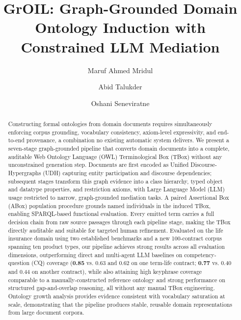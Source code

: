\documentclass[sigconf]{acmart}
\begin{document}
\title{GrOIL: Graph-Grounded Domain Ontology Induction with Constrained LLM Mediation}


\author{Maruf Ahmed Mridul}

\author{Abid Talukder}

\author{Oshani Seneviratne}

\renewcommand{\shortauthors}{Maruf Ahmed Mridul, Abid Talukder, and Oshani Seneviratne}



\begin{abstract}
Constructing formal ontologies from domain documents requires simultaneously enforcing corpus grounding, vocabulary consistency,  axiom-level expressivity, and end-to-end provenance, a combination no existing automatic system delivers. We present a seven-stage  graph-grounded pipeline that converts domain documents into a complete, auditable Web Ontology Language (OWL) Terminological Box (TBox) without any unconstrained generation step. Documents are first encoded as Unified Discourse-Hypergraphs (UDH) capturing entity participation and discourse dependencies; subsequent stages transform  this graph evidence into a class hierarchy, typed object and datatype properties, and restriction axioms, with Large Language Model (LLM) usage restricted to narrow, graph-grounded mediation tasks. A paired Assertional Box (ABox) population procedure grounds named individuals in the induced TBox, enabling SPARQL-based functional evaluation. Every emitted term carries a full decision chain from raw source passages through each pipeline stage, making the TBox directly auditable and suitable for targeted human refinement. Evaluated on the life insurance domain using two established benchmarks and a new 100-contract corpus spanning ten product types, our pipeline achieves strong results across all evaluation dimensions, outperforming direct and multi-agent LLM baselines on competency-question (CQ) coverage (\textbf{0.85} vs. 0.63 and 0.62 on one term-life contract; \textbf{0.77} vs. 0.40 and 0.44 on another contract), while also attaining high keyphrase coverage comparable to a manually-constructed reference ontology and strong performance on structured gap-and-overlap reasoning, all without any manual TBox engineering. Ontology growth analysis provides evidence consistent with vocabulary saturation at scale, demonstrating that the pipeline produces stable, reusable domain representations from large document corpora.
\end{abstract}
\end{document}
